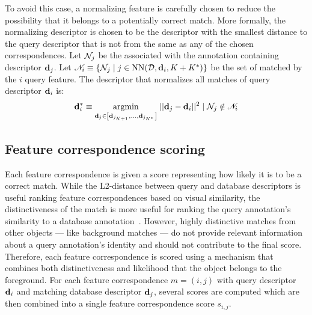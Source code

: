             \knorm{}

            To avoid this case, a normalizing feature is carefully chosen to reduce the possibility that it
              belongs to a potentially correct match.
            More formally, the normalizing descriptor is chosen to be the descriptor with the smallest distance
              to the query descriptor that is not from the same \name{} as any of the chosen correspondences.
            Let $\mathcal{N}_j$ be the \name{} associated with the annotation containing descriptor $\mathbf{d}_j$.
            Let %
            $\mathscr{N}_i \equiv \left\{\mathcal{N}_j \mid j \in \operatorname{NN}(\mathcal{D}, \mathbf{d}_i, K + K^{*})\right\}$
            be the set of \names{} matched by the $i$\th{} query feature.
            The descriptor that normalizes all matches of query descriptor $\mathbf{d}_i$ is:
              \begin{equation}
                  \mathbf{d}^{*}_{i} \equiv 
                  \underset{\mathbf{d}_j \in \left[\mathbf{d}_{{j_{K + 1}}}, \ldots{}, \mathbf{d}_{j_{K^{*}}}\right]}{\operatorname{argmin}}\;
                  ||\mathbf{d}_j - \mathbf{d}_i||^2 \mid \mathcal{N}_j \notin \mathscr{N}_i
              \end{equation}

    \subsection{Feature correspondence scoring}
        Each feature correspondence is given a score representing how likely it is to be a correct match.
        While the L2-distance between query and database descriptors is useful ranking feature correspondences
          based on visual similarity, the distinctiveness of the match is more useful for ranking the query
          annotation's similarity to a database annotation~\cite{lowe_distinctive_2004,
          arandjelovic_dislocation_2015, mccann_local_2012}.
        However, highly distinctive matches from other objects --- like background matches --- do not provide
          relevant information about a query annotation's identity and should not contribute to the final score.
        Therefore, each feature correspondence is scored using a mechanism that combines both distinctiveness and
          likelihood that the object belongs to the foreground.
        For each feature correspondence $m = (i, j)$ with query descriptor $\mathbf{d}_i$ and matching database
          descriptor $\mathbf{d}_j$, several scores are computed which are then combined into a single feature
          correspondence score $s_{i,j}$.

